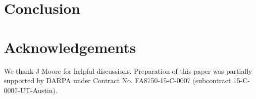 \documentclass[submission,copyright,creativecommons]{eptcs}
\begin{document}
\section{Conclusion}
\label{sec:conclusion}


\section*{Acknowledgements}

We thank J Moore for helpful discussions.
Preparation of this paper was partially supported by DARPA under
Contract No. FA8750-15-C-0007 (subcontract 15-C-0007-UT-Austin).



\end{document}
